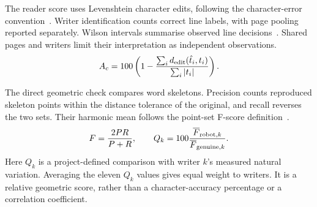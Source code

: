 The reader score uses Levenshtein character edits, following the character-error convention~\cite[p.~2]{graves2006}. Writer identification counts correct line labels, with page pooling reported separately. Wilson intervals summarise observed line decisions~\cite[pp.~209--212]{wilson1927}. Shared pages and writers limit their interpretation as independent observations.
\begin{equation}
A_c=100\left(1-\frac{\sum_i d_{\rm edit}(\hat t_i,t_i)}{\sum_i |t_i|}\right).
\label{eq:res-char}
\end{equation}

The direct geometric check compares word skeletons. Precision counts reproduced skeleton points within the distance tolerance of the original, and recall reverses the two sets. Their harmonic mean follows the point-set F-score definition~\cite{tanks2017}.
\begin{equation}
F=\frac{2PR}{P+R},\qquad
Q_k=100\frac{\overline F_{{\rm robot},k}}{\overline F_{{\rm genuine},k}}.
\label{eq:res-geometric}
\end{equation}
Here $Q_k$ is a project-defined comparison with writer $k$'s measured natural variation. Averaging the eleven $Q_k$ values gives equal weight to writers. It is a relative geometric score, rather than a character-accuracy percentage or a correlation coefficient.

